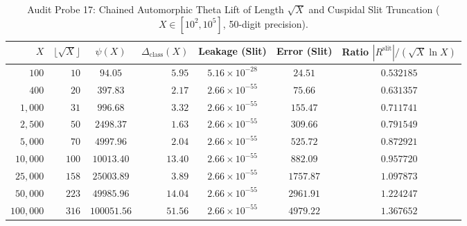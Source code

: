 \documentclass[11pt,a4paper]{article}
\begin{document}
\begin{table}[htbp]
\centering
\small
\caption{Audit Probe 17: Chained Automorphic Theta Lift of Length $\sqrt{X}$ and Cuspidal Slit Truncation ($X \in [10^2, 10^5]$, 50-digit precision).}
\label{tab:theta_lift_audit}
\begin{tabular}{rrcrccc}
\hline
$X$ & $\lfloor\sqrt{X}\rfloor$ & $\psi(X)$ & $\Delta_{\mathrm{class}}(X)$ & Leakage (Slit) & Error (Slit) & Ratio $|R^{\mathrm{slit}}| / (\sqrt{X}\ln X)$ \\
\hline
$100$ & $10$ & $94.05$ & $5.95$ & $5.16 \times 10^{-28}$ & $24.51$ & $0.532185$ \\
$400$ & $20$ & $397.83$ & $2.17$ & $2.66 \times 10^{-55}$ & $75.66$ & $0.631357$ \\
$1{,}000$ & $31$ & $996.68$ & $3.32$ & $2.66 \times 10^{-55}$ & $155.47$ & $0.711741$ \\
$2{,}500$ & $50$ & $2498.37$ & $1.63$ & $2.66 \times 10^{-55}$ & $309.66$ & $0.791549$ \\
$5{,}000$ & $70$ & $4997.96$ & $2.04$ & $2.66 \times 10^{-55}$ & $525.72$ & $0.872921$ \\
$10{,}000$ & $100$ & $10013.40$ & $13.40$ & $2.66 \times 10^{-55}$ & $882.09$ & $0.957720$ \\
$25{,}000$ & $158$ & $25003.89$ & $3.89$ & $2.66 \times 10^{-55}$ & $1757.87$ & $1.097873$ \\
$50{,}000$ & $223$ & $49985.96$ & $14.04$ & $2.66 \times 10^{-55}$ & $2961.91$ & $1.224247$ \\
$100{,}000$ & $316$ & $100051.56$ & $51.56$ & $2.66 \times 10^{-55}$ & $4979.22$ & $1.367652$ \\
\hline
\end{tabular}
\end{table}
\end{document}
